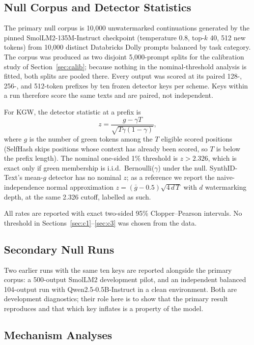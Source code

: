 \documentclass[conference]{IEEEtran}
\begin{document}
\subsection{Null Corpus and Detector Statistics}

The primary null corpus is 10,000 unwatermarked continuations generated by the
pinned SmolLM2-135M-Instruct checkpoint (temperature 0.8, top-$k$ 40, 512 new
tokens) from 10,000 distinct Databricks Dolly prompts balanced by task category.
The corpus was produced as two disjoint 5,000-prompt splits for the calibration
study of Section~\ref{sec:calib}; because nothing in the nominal-threshold analysis
is fitted, both splits are pooled there. Every output was scored at its paired
128-, 256-, and 512-token prefixes by ten frozen detector keys per scheme. Keys
within a run therefore score the same texts and are paired, not independent.

For KGW, the detector statistic at a prefix is
\begin{equation}
  z = \frac{g - \gamma T}{\sqrt{T\gamma(1-\gamma)}},
  \label{eq:kgwz}
\end{equation}
where $g$ is the number of green tokens among the $T$ eligible scored positions
(SelfHash skips positions whose context has already been scored, so $T$ is below
the prefix length). The nominal one-sided 1\% threshold is $z>2.326$, which is
exact only if green membership is i.i.d.\ Bernoulli($\gamma$) under the null.
SynthID-Text's mean-$g$ detector has no nominal $z$; as a reference we report the
naive-independence normal approximation
$z=(\bar g-0.5)\sqrt{4\,d\,T}$ with $d$ watermarking depth, at the same 2.326
cutoff, labelled as such.

All rates are reported with exact two-sided 95\% Clopper--Pearson intervals. No
threshold in Sections~\ref{sec:c1}--\ref{sec:c3} was chosen from the data.

\subsection{Secondary Null Runs}

Two earlier runs with the same ten keys are reported alongside the primary corpus:
a 500-output SmolLM2 development pilot, and an independent balanced 104-output run
with Qwen2.5-0.5B-Instruct in a clean environment. Both are development
diagnostics; their role here is to show that the primary result reproduces and
that which key inflates is a property of the model.

\subsection{Mechanism Analyses}
\label{sec:mech-methods}
\end{document}
